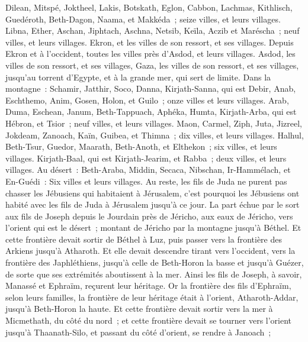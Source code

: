 \begin{multicols}{2}
Dilean, Mitspé, Joktheel,
Lakis, Botskath, Eglon,
Cabbon, Lachmas, Kithlisch,
Guedéroth, Beth-Dagon, Naama, et Makkéda~; seize villes, et leurs villages.
Libna, Ether, Aschan,
Jiphtach, Aschna, Netsib,
Keïla, Aczib et Maréscha~; neuf villes, et leurs villages.
Ekron, et les villes de son ressort, et ses villages.
Depuis Ekron et à l'occident, toutes les villes près d'Asdod, et leurs villages.
Asdod, les villes de son ressort, et ses villages, Gaza, les villes de son ressort, et ses villages, jusqu'au torrent d'Egypte, et à la grande mer, qui sert de limite.
Dans la montagne~: Schamir, Jatthir, Soco,
Danna, Kirjath-Sanna, qui est Debir,
Anab, Eschthemo, Anim,
Gosen, Holon, et Guilo~; onze villes et leurs villages.
Arab, Duma, Eschean,
Janum, Beth-Tappuach, Aphéka,
Humta, Kirjath-Arba, qui est Hébron, et Tsior~; neuf villes, et leurs villages.
Maon, Carmel, Ziph, Juta,
Jizreel, Jokdeam, Zanoach,
Kaïn, Guibea, et Thimna~; dix villes, et leurs villages.
Halhul, Beth-Tsur, Guedor,
Maarath, Beth-Anoth, et Elthekon~; six villes, et leurs villages.
Kirjath-Baal, qui est Kirjath-Jearim, et Rabba~; deux villes, et leurs villages.
Au désert~: Beth-Araba, Middin, Secaca,
Nibschan, Ir-Hammélach, et En-Guédi~: Six villes et leurs villages.
Au reste, les fils de Juda ne purent pas chasser les Jébusiens qui habitaient à Jérusalem, c'est pourquoi les Jébusiens ont habité avec les fils de Juda à Jérusalem jusqu'à ce jour.
\VerseOne{}La part échue par le sort aux fils de Joseph depuis le Jourdain près de Jéricho, aux eaux de Jéricho, vers l'orient qui est le désert~; montant de Jéricho par la montagne jusqu'à Béthel.
Et cette frontière devait sortir de Béthel à Luz, puis passer vers la frontière des Arkiens jusqu'à Atharoth.
Et elle devait descendre tirant vers l'occident, vers la frontière des Japhléthiens, jusqu'à celle de Beth-Horon la basse et jusqu'à Guézer, de sorte que ses extrémités aboutissent à la mer.
Ainsi les fils de Joseph, à savoir, Manassé et Ephraïm, reçurent leur héritage.
Or la frontière des fils d'Ephraïm, selon leurs familles, la frontière de leur héritage était à l'orient, Atharoth-Addar, jusqu'à Beth-Horon la haute.
Et cette frontière devait sortir vers la mer à Micmethath, du côté du nord~; et cette frontière devait se tourner vers l'orient jusqu'à Thaanath-Silo, et passant du côté d'orient, se rendre à Janoach~;

\end{multicols}
